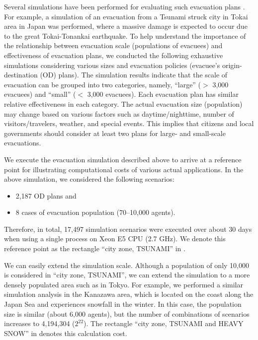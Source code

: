 Several simulations have been performed for 
evaluating such evacuation plans
\cite{Noda2009x}\cite{Noda2010p}\cite{Noda2010y}\cite{Yamashita2014}.
For example, a simulation of an evacuation from
a Tsunami struck city in Tokai area in Japan was performed, where
a massive damage is expected to occur due to the great Tokai-Tonankai earthquake.
To help understand the importance of the relationship between
evacuation scale (populations of evacuees) and effectiveness of evacuation
plans, we conducted the following exhaustive simulations considering various sizes and evacuation
policies (evacuee's origin-destination (OD) plans).
The simulation results indicate that
the scale of evacuation can be grouped into two categories, namely,
``large'' ($>$ 3,000 evacuees) and
``small'' ($<$ 3,000 evacuees). 
Each evacuation plan has similar relative
effectiveness in each category.
The actual evacuation size (population) may change based on various factors
such as daytime/nighttime, number of visitors/travelers, weather, and
special events.
This implies that citizens and local governments should consider at least 
two plans for large- and small-scale evacuations.

We execute the evacuation simulation described above to arrive at
a reference point for illustrating computational costs of various
actual applications.
In the above simulation, we considered the following scenarios:
\begin{itemize}
  \item 2,187 OD plans and
  \item 8 cases of evacuation population (70--10,000 agents).
\end{itemize}
Therefore, in total, 17,497 simulation scenarios were executed
over about 30 days when using a single process on Xeon E5 CPU (2.7 GHz).
We denote this reference point as the rectangle
``city zone, TSUNAMI'' in .

We can easily extend the simulation scale.
Although a population of only 10,000 is considered in ``city zone, TSUNAMI'',
we can extend the simulation to a more densely populated area such as in Tokyo.
For example,
we performed a similar simulation analysis in the Kanazawa area,
which is located on the coast along the Japan Sea and
experiences snowfall in the winter.
In this case, the population size is similar (about 6,000 agents),
but the number of combinations of scenarios increases to 4,194,304 ($2^{22}$).
The rectangle ``city zone, TSUNAMI and HEAVY SNOW'' in 
 denotes this calculation cost.

